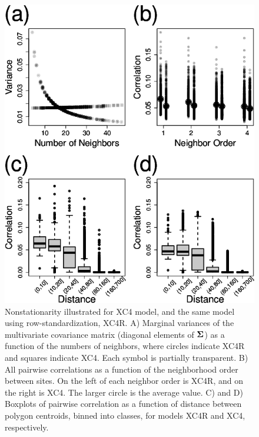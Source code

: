 \documentclass[11pt, titlepage]{article}\usepackage[]{graphicx}\usepackage[]{color}
\begin{document}
\begin{spacing}{1.9}
\begin{flushleft}
\begin{figure}[H]
  \begin{center}
  \includegraphics[width=.7\linewidth]{figure/Fig-MargVar.png}
  \end{center}
  \caption{Nonstationarity illustrated for XC4 model, and the same model using row-standardization, XC4R.  A) Marginal variances of the multivariate covariance matrix (diagonal elements of $\mbox{\boldmath $\Sigma$}$) as a function of the numbers of neighbors, where circles indicate XC4R and squares indicate XC4.  Each symbol is partially transparent. B) All pairwise correlations as a function of the neighborhood order between sites. On the left of each neighbor order is XC4R, and on the right is XC4.  The larger circle is the average value. C) and D) Boxplots of pairwise correlation as a function of distance between polygon centroids, binned into classes, for models XC4R and XC4, respectively. \label{Fig-MargVar}}     
\end{figure}







\end{flushleft}
\end{spacing}
\end{document}
